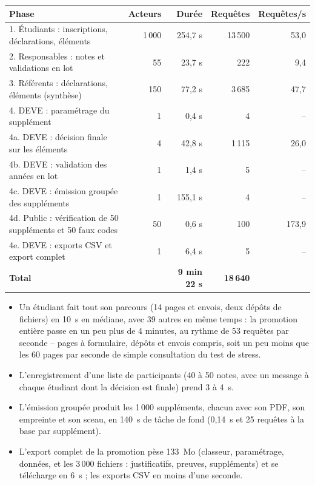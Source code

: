 \documentclass[11pt,a4paper]{article}
\begin{document}
\begin{center}
\begin{tabularx}{\linewidth}{@{}X r r r r@{}}
\toprule
\textbf{Phase} & \textbf{Acteurs} & \textbf{Durée} & \textbf{Requêtes} & \textbf{Requêtes/s} \\
\midrule
1. Étudiants : inscriptions, déclarations, éléments & 1\,000 & 254,7 s & 13\,500 & 53,0 \\
2. Responsables : notes et validations en lot & 55 & 23,7 s & 222 & 9,4 \\
3. Référents : déclarations, éléments (synthèse) & 150 & 77,2 s & 3\,685 & 47,7 \\
4. DEVE : paramétrage du supplément & 1 & 0,4 s & 4 & -- \\
4a. DEVE : décision finale sur les éléments & 4 & 42,8 s & 1\,115 & 26,0 \\
4b. DEVE : validation des années en lot & 1 & 1,4 s & 5 & -- \\
4c. DEVE : émission groupée des suppléments & 1 & 155,1 s & 4 & -- \\
4d. Public : vérification de 50 suppléments et 50 faux codes & 50 & 0,6 s & 100 & 173,9 \\
4e. DEVE : exports CSV et export complet & 1 & 6,4 s & 5 & -- \\
\midrule
\textbf{Total} & & \textbf{9 min 22 s} & \textbf{18\,640} & \\
\bottomrule
\end{tabularx}
\end{center}

\begin{itemize}
  \item Un étudiant fait tout son parcours (14 pages et envois, deux dépôts de fichiers) en
    10~s en médiane, avec 39 autres en même temps : la promotion entière passe en un peu plus de
    4 minutes, au rythme de 53 requêtes par seconde -- pages à formulaire, dépôts et envois
    compris, soit un peu moins que les 60 pages par seconde de simple consultation du test de
    stress.
  \item L'enregistrement d'une liste de participants (40 à 50 notes, avec un message à chaque
    étudiant dont la décision est finale) prend 3 à 4~s.
  \item L'émission groupée produit les 1\,000 suppléments, chacun avec son PDF, son empreinte et
    son sceau, en 140~s de tâche de fond (0,14~s et 25 requêtes à la base par supplément).
  \item L'export complet de la promotion pèse 133~Mo (classeur, paramétrage, données, et les
    3\,000 fichiers : justificatifs, preuves, suppléments) et se télécharge en 6~s ; les exports
    CSV en moins d'une seconde.
\end{itemize}
\end{document}
